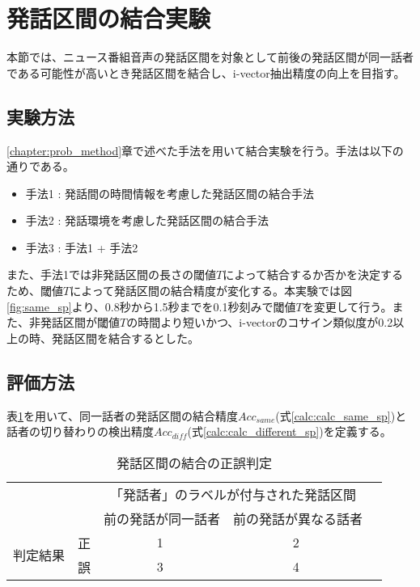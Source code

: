 \section{発話区間の結合実験}
\label{chapter:connect_sp}
本節では、ニュース番組音声の発話区間を対象として前後の発話区間が同一話者である可能性が高いとき発話区間を結合し、i-vector抽出精度の向上を目指す。

\subsection{実験方法}
\ref{chapter:prob_method}章で述べた手法を用いて結合実験を行う。手法は以下の通りである。

\begin{itemize}
\item 手法1 : 発話間の時間情報を考慮した発話区間の結合手法
\item 手法2 : 発話環境を考慮した発話区間の結合手法
\item 手法3 : 手法1 + 手法2
\end{itemize}\par\par

また、手法1では非発話区間の長さの閾値$T$によって結合するか否かを決定するため、閾値$T$によって発話区間の結合精度が変化する。本実験では図\ref{fig:same_sp}より、0.8秒から1.5秒までを0.1秒刻みで閾値$T$を変更して行う。また、非発話区間が閾値$T$の時間より短いかつ、i-vectorのコサイン類似度が0.2以上の時、発話区間を結合するとした。

\subsection{評価方法}
表\ref{table:connect_calc}を用いて、同一話者の発話区間の結合精度$Acc_{same}$(式\ref{calc:calc_same_sp})と話者の切り替わりの検出精度$Acc_{diff}$(式\ref{calc:calc_different_sp})を定義する。

\begin{table}[H]
\begin{center}
    \caption{発話区間の結合の正誤判定 \label{table:connect_calc}}
\begin{tabular}{|c|c|c|c|l}
\cline{1-4}
\multicolumn{2}{|c|}{\multirow{2}{*}{}} & \multicolumn{2}{c|}{「発話者」のラベルが付与された発話区間} &  \\ \cline{3-4}
\multicolumn{2}{|c|}{}                  & 前の発話が同一話者        & 前の発話が異なる話者        &  \\ \cline{1-4}
\multirow{2}{*}{判定結果}        & 正        & \textcircled{\scriptsize 1}                  & \textcircled{\scriptsize 2}                   &  \\ \cline{2-4}
& 誤        & \textcircled{\scriptsize 3}                  & \textcircled{\scriptsize 4}                   &  \\ \cline{1-4}
\end{tabular}
\end{center}
\end{table}


